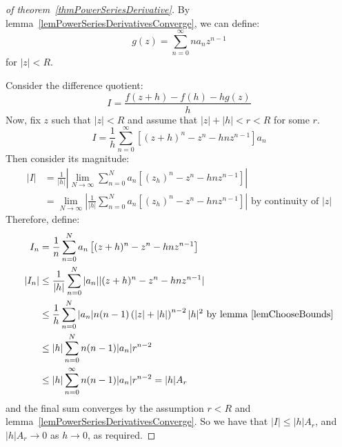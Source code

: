 \documentclass[../Main.tex]{subfiles}
\begin{document}
\begin{proof}[of theorem~\ref{thmPowerSeriesDerivative}]
    By lemma~\ref{lemPowerSeriesDerivativesConverge}, we can define:
    \begin{equation*}
        g(z) = \sum_{n=0}^\infty na_n z^{n-1}
    \end{equation*}
    for $|z| < R$.\par
    Consider the difference quotient:
    \begin{equation*}
        I = \frac{f(z + h) - f(h) - hg(z)}{h}
    \end{equation*}
    Now, fix $z$ such that $|z| < R$ and assume that $|z| + |h| < r < R$ for some $r$.
    \begin{equation*}
        I = \frac{1}{h} \sum_{n = 0}^\infty \left[(z + h)^n - z^n - hnz^{n-1}\right]a_n
    \end{equation*}
    Then consider its magnitude:
    \begin{align*}
        |I| &= \frac{1}{|h|} \left|\lim_{N \to \infty} \sum_{n = 0}^N a_n\left[(z _ h)^n - z^n - hnz^{n-1}\right]\right| \\
        &= \lim_{N \to \infty} \left|\frac{1}{|h|} \sum_{n = 0}^N a_n\left[(z _ h)^n - z^n - hnz^{n-1}\right]\right| \text{ by continuity of } |z|
    \end{align*}
    Therefore, define:
    \begin{align*}
        I_n &= \frac{1}{n} \sum_{n = 0}^N a_n \left[(z + h)^n - z^n - hnz^{n-1}\right] \\
       |I_n| &\leq \frac{1}{|h|} \sum_{n = 0}^N |a_n| |(z + h)^n - z^n - hnz^{n-1}| \\
       &\leq \frac{1}{h} \sum_{n = 0}^N |a_n| n(n-1) \left(|z| + |h|\right)^{n-2} |h|^2 \text{ by lemma~\ref{lemChooseBounds}}\\
       &\leq |h| \sum_{n = 0}^N n(n-1) |a_n| r^{n-2} \\
       &\leq |h| \sum_{n = 0}^\infty n(n-1) |a_n| r^{n-2} = |h| A_r
    \end{align*}
    and the final sum converges by the assumption $r < R$ and lemma~\ref{lemPowerSeriesDerivativesConverge}.
    So we have that $|I| \leq |h| A_r$, and $|h| A_r \to 0$ as $h \to 0$, as required.
\end{proof}
\end{document}
